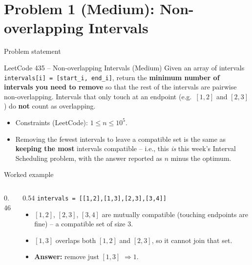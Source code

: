 \documentclass[11pt,aspectratio=169]{beamer}
\begin{document}
\section{Problem 1 (Medium): Non-overlapping Intervals}

\begin{frame}{Problem statement}
  \begin{block}{LeetCode 435 -- Non-overlapping Intervals (\textcolor{blue!50!black}{Medium})}
    Given an array of intervals \texttt{intervals[i] = [start\_i, end\_i]}, return the
    \textbf{minimum number of intervals you need to remove} so that the rest of the
    intervals are pairwise non-overlapping. Intervals that only touch at an endpoint
    (e.g.\ $[1,2]$ and $[2,3]$) do \textbf{not} count as overlapping.
  \end{block}
  \begin{itemize}
    \item Constraints (LeetCode): $1 \le n \le 10^5$.
    \item Removing the fewest intervals to leave a compatible set is the same as
    \textbf{keeping the most} intervals compatible -- i.e., this \emph{is} this week's
    Interval Scheduling problem, with the answer reported as $n$ minus the optimum.
  \end{itemize}
\end{frame}

\begin{frame}{Worked example}
  \begin{columns}
  \begin{column}{0.46\textwidth}
  \begin{center}
  \end{center}
  \end{column}
  \begin{column}{0.54\textwidth}
  \small
  \texttt{intervals = [[1,2],[1,3],[2,3],[3,4]]}
  \begin{itemize}
    \item $[1,2]$, $[2,3]$, $[3,4]$ are mutually compatible (touching endpoints are
    fine) -- a compatible set of size $3$.
    \item $[1,3]$ overlaps both $[1,2]$ and $[2,3]$, so it cannot join that set.
    \item \textbf{Answer:} remove just $[1,3]$ $\Rightarrow \boxed{1}$.
  \end{itemize}
  \end{column}
  \end{columns}
\end{frame}
\end{document}
